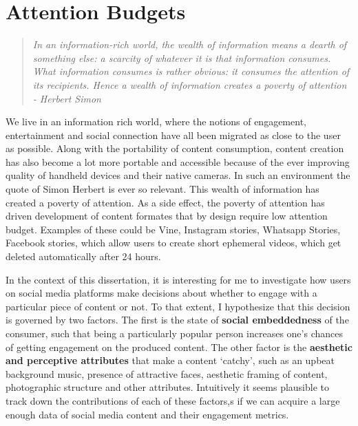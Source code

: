 
\chapter{Attention Budgets}

\graphicspath{{Chapter2/plots/}}
\begin{quote}
    
    \textsl{In an information-rich world, the wealth of information means a  dearth of something else: a  scarcity of whatever it  is that information consumes. What information consumes is  rather obvious: it consumes the attention of its recipients. Hence a wealth of information creates a poverty of attention - Herbert Simon}\cite{simon1971designing}
    
\end{quote}
We live in an information rich world, where the notions of engagement, entertainment and social connection have all been migrated as close to the user as possible. Along with the portability of content consumption, content creation has also become a lot more portable and accessible because of the ever improving quality of handheld devices and their native cameras. In such an environment the quote of Simon Herbert is ever so relevant. This wealth of information has created a poverty of attention. As a side effect, the poverty of attention has driven development of content formates that by design require low attention budget. Examples of these could be Vine, Instagram stories, Whatsapp Stories, Facebook stories,  which allow users to create short ephemeral videos, which get deleted automatically after 24 hours. 

In the context of this dissertation, it is interesting for me to investigate how users on social media platforms make decisions about whether to engage with a particular piece of content or not. To that extent, I hypothesize that this decision is governed by two factors. The first is the state of \textbf{social embeddedness} of the consumer, such that being a particularly popular person increases one's chances of getting engagement on the produced content. The other factor is the \textbf{aesthetic and perceptive attributes} that make a content `catchy', such as an upbeat background music, presence of attractive faces, aesthetic framing of content, photographic structure and other attributes. Intuitively it seems plausible to track down the contributions of each of these factors,s if we can acquire a large enough data of social media content and their engagement metrics.

